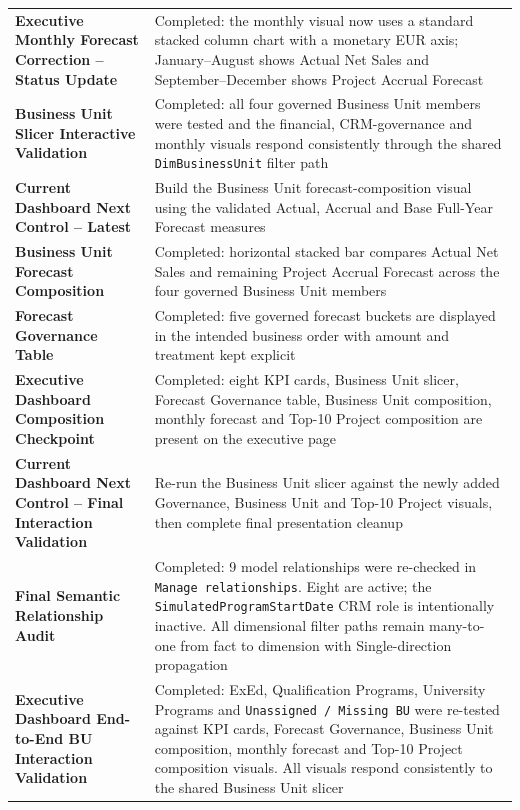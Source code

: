 \documentclass[11pt,a4paper]{article}
\begin{document}
\begin{summarybox}
\begin{tabularx}{\textwidth}{
    >{\bfseries\color{AaltoNavy}}p{4.3cm}
    X
}
Executive Monthly Forecast Correction -- Status Update
&
Completed: the monthly visual now uses a standard stacked column chart with a
monetary EUR axis; January--August shows Actual Net Sales and
September--December shows Project Accrual Forecast
\\

Business Unit Slicer Interactive Validation
&
Completed: all four governed Business Unit members were tested and the financial,
CRM-governance and monthly visuals respond consistently through the shared
\texttt{DimBusinessUnit} filter path
\\

Current Dashboard Next Control -- Latest
&
Build the Business Unit forecast-composition visual using the validated
Actual, Accrual and Base Full-Year Forecast measures
\\



Business Unit Forecast Composition
&
Completed: horizontal stacked bar compares Actual Net Sales and remaining Project
Accrual Forecast across the four governed Business Unit members
\\

Forecast Governance Table
&
Completed: five governed forecast buckets are displayed in the intended business
order with amount and treatment kept explicit
\\

Executive Dashboard Composition Checkpoint
&
Completed: eight KPI cards, Business Unit slicer, Forecast Governance table,
Business Unit composition, monthly forecast and Top-10 Project composition are
present on the executive page
\\

Current Dashboard Next Control -- Final Interaction Validation
&
Re-run the Business Unit slicer against the newly added Governance, Business Unit
and Top-10 Project visuals, then complete final presentation cleanup
\\



Final Semantic Relationship Audit
&
Completed: 9 model relationships were re-checked in \texttt{Manage relationships}.
Eight are active; the \texttt{SimulatedProgramStartDate} CRM role is intentionally
inactive. All dimensional filter paths remain many-to-one from fact to dimension
with Single-direction propagation
\\

Executive Dashboard End-to-End BU Interaction Validation
&
Completed: ExEd, Qualification Programs, University Programs and
\texttt{Unassigned / Missing BU} were re-tested against KPI cards, Forecast Governance,
Business Unit composition, monthly forecast and Top-10 Project composition visuals.
All visuals respond consistently to the shared Business Unit slicer
\\


\end{tabularx}
\end{summarybox}
\end{document}
